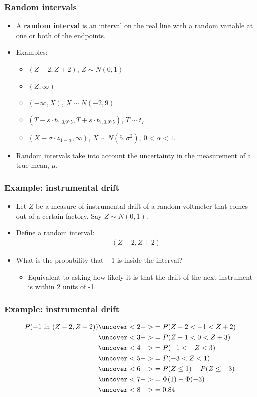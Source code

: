 \documentclass[handout]{beamer}\usepackage[]{graphicx}\usepackage[]{color}
\numberwithin{equation}{section}
\begin{document}
\begin{frame}
\frametitle{Random intervals}
\begin{itemize}
\item A {\bf random interval} is an interval on the real line with a random variable at one or both of the endpoints.
\pause \item Examples:
\begin{itemize}
\pause \item $(Z - 2, Z + 2)$, $Z \sim N(0,1)$
\pause \item $(Z, \infty)$
\pause \item $(-\infty, X)$, $X \sim N(-2, 9)$
\pause \item $(T - s \cdot t_{7, 0.975}, T + s \cdot t_{7, 0.975})$, $T \sim t_{7}$
\pause \item $(X - \sigma \cdot z_{1 - \alpha}, \infty)$, $X \sim N(5, \sigma^2), \ 0 < \alpha < 1$.
\end{itemize}
\pause \item Random intervals take into account the uncertainty in the measurement of a true mean, $\mu$. 
\end{itemize}
\end{frame}

\begin{frame}
\frametitle{Example: instrumental drift}
\begin{itemize}
\item Let $Z$ be a measure of instrumental drift of a random voltmeter that comes out of a certain factory. Say
$Z \sim N(0,1)$.
\pause \item Define a random interval:
\pause \begin{align*}
(Z - 2, Z + 2)
\end{align*}
\pause \item What is the probability that $-1$ is inside the interval?
\begin{itemize}
\pause \item Equivalent to asking how likely it is that the drift of the next instrument is within 2 units of -1.
\end{itemize}
\end{itemize}
\end{frame}

\begin{frame}
\frametitle{Example: instrumental drift}
\begin{align*}
P (-1 \text{ in } (Z - 2, Z + 2)) & \uncover<2->{= P (Z - 2 < -1 < Z + 2)} \\
&\uncover<3->{= P (Z -1 < 0 < Z + 3)} \\
&\uncover<4->{= P(-1 < -Z < 3)} \\
&\uncover<5->{= P(-3 < Z < 1)} \\
&\uncover<6->{= P(Z \le 1)-P(Z \le -3)} \\
&\uncover<7->{= \Phi(1) - \Phi(-3)} \\
&\uncover<8->{= 0.84}
\end{align*}
\end{frame}
\end{document}
